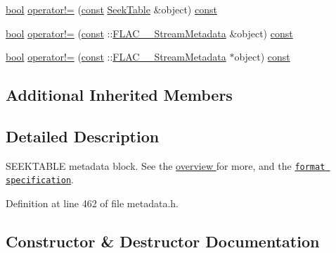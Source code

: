 {\bf }\par
\begin{DoxyCompactItemize}
\item 
\hyperlink{mac_2config_2i386_2lib-src_2libsoxr_2soxr-config_8h_abb452686968e48b67397da5f97445f5b}{bool} \hyperlink{class_f_l_a_c_1_1_metadata_1_1_seek_table_ab120ab96e99d68d607badd473b8a74eb}{operator!=} (\hyperlink{getopt1_8c_a2c212835823e3c54a8ab6d95c652660e}{const} \hyperlink{class_f_l_a_c_1_1_metadata_1_1_seek_table}{Seek\+Table} \&object) \hyperlink{getopt1_8c_a2c212835823e3c54a8ab6d95c652660e}{const} 
\item 
\hyperlink{mac_2config_2i386_2lib-src_2libsoxr_2soxr-config_8h_abb452686968e48b67397da5f97445f5b}{bool} \hyperlink{class_f_l_a_c_1_1_metadata_1_1_seek_table_a3e264fa0e0ec795b47e8d204d27b418e}{operator!=} (\hyperlink{getopt1_8c_a2c212835823e3c54a8ab6d95c652660e}{const} \+::\hyperlink{struct_f_l_a_c_____stream_metadata}{F\+L\+A\+C\+\_\+\+\_\+\+Stream\+Metadata} \&object) \hyperlink{getopt1_8c_a2c212835823e3c54a8ab6d95c652660e}{const} 
\item 
\hyperlink{mac_2config_2i386_2lib-src_2libsoxr_2soxr-config_8h_abb452686968e48b67397da5f97445f5b}{bool} \hyperlink{class_f_l_a_c_1_1_metadata_1_1_seek_table_a267984dede404dc9cf544aa752dbb6df}{operator!=} (\hyperlink{getopt1_8c_a2c212835823e3c54a8ab6d95c652660e}{const} \+::\hyperlink{struct_f_l_a_c_____stream_metadata}{F\+L\+A\+C\+\_\+\+\_\+\+Stream\+Metadata} $\ast$object) \hyperlink{getopt1_8c_a2c212835823e3c54a8ab6d95c652660e}{const} 
\end{DoxyCompactItemize}

\subsection*{Additional Inherited Members}


\subsection{Detailed Description}
S\+E\+E\+K\+T\+A\+B\+LE metadata block. See the \hyperlink{group__flacpp__metadata__object}{overview } for more, and the \href{../format.html#metadata_block_seektable}{\tt format specification}. 

Definition at line 462 of file metadata.\+h.



\subsection{Constructor \& Destructor Documentation}
